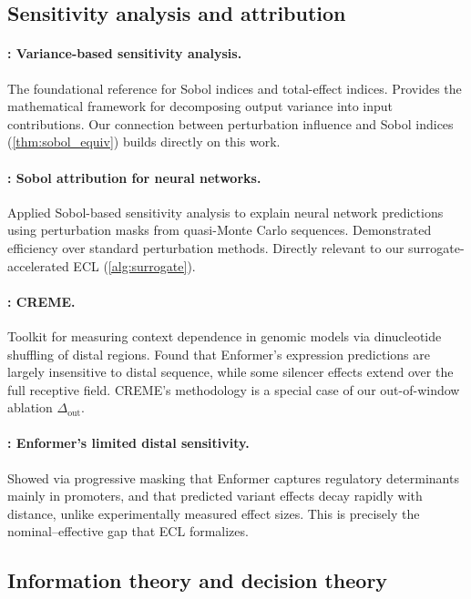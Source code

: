 \subsection{Sensitivity analysis and attribution}

\paragraph{\citet{Saltelli2010VarianceSA}: Variance-based sensitivity analysis.}
The foundational reference for Sobol indices and total-effect indices. Provides the mathematical framework for decomposing output variance into input contributions. Our connection between perturbation influence and Sobol indices (\cref{thm:sobol_equiv}) builds directly on this work.

\paragraph{\citet{Fel2021Sobol}: Sobol attribution for neural networks.}
Applied Sobol-based sensitivity analysis to explain neural network predictions using perturbation masks from quasi-Monte Carlo sequences. Demonstrated efficiency over standard perturbation methods. Directly relevant to our surrogate-accelerated ECL (\cref{alg:surrogate}).

\paragraph{\citet{Toneyan2024CREME}: CREME.}
Toolkit for measuring context dependence in genomic models via dinucleotide shuffling of distal regions. Found that Enformer's expression predictions are largely insensitive to distal sequence, while some silencer effects extend over the full receptive field. CREME's methodology is a special case of our out-of-window ablation $\Delta_{\mathrm{out}}$.

\paragraph{\citet{Karollus2023Limited}: Enformer's limited distal sensitivity.}
Showed via progressive masking that Enformer captures regulatory determinants mainly in promoters, and that predicted variant effects decay rapidly with distance, unlike experimentally measured effect sizes. This is precisely the nominal--effective gap that ECL formalizes.

\subsection{Information theory and decision theory}

